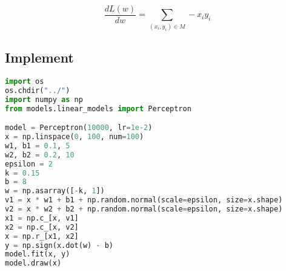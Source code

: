 \documentclass{report}
\begin{document}
$$
\frac{dL(w)}{dw}=\sum_{(x_i,y_i)\in M} -x_i y_i
$$
\newpage
\subsection{Implement}
\begin{lstlisting}[language={python}]
%matplotlib inline
import os
os.chdir("../")
import numpy as np
from models.linear_models import Perceptron

model = Perceptron(10000, lr=1e-2)
x = np.linspace(0, 100, num=100)
w1, b1 = 0.1, 5
w2, b2 = 0.2, 10
epsilon = 2
k = 0.15
b = 8
w = np.asarray([-k, 1])
v1 = x * w1 + b1 + np.random.normal(scale=epsilon, size=x.shape)
v2 = x * w2 + b2 + np.random.normal(scale=epsilon, size=x.shape)
x1 = np.c_[x, v1]
x2 = np.c_[x, v2]
x = np.r_[x1, x2]
y = np.sign(x.dot(w) - b)
model.fit(x, y)
model.draw(x)
\end{lstlisting}
\end{document}
